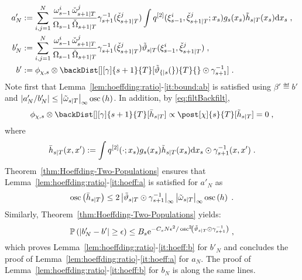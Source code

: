 \begin{align*}
a'_N & \eqdef \sum_{i,j=1}^N \frac{\ewght{s-1}{i}\,\ebackwght{s+1}{T}{j}}{\sumwght{s-1}\,\backsumwght{s+1}{T}}\gamma_{s+1}^{-1}(\ebackpart{s+1}{T}{j}) \int q^{[2]}(\epart{s-1}{i},\ebackpart{s+1}{T}{j};x_s) g_s(x_s) \tilde{h}_{s|T}(x_s) \rmd x_s\eqsp,\\
b'_N & \eqdef \sum_{i,j=1}^N \frac{\ewght{s-1}{i}\,\ebackwght{s+1}{T}{j}}{\sumwght{s-1}\,\backsumwght{s+1}{T}}\gamma_{s+1}^{-1}(\ebackpart{s+1}{T}{j})\adjfunc[smooth]{s}{T}{\epart{s-1}{i},\ebackpart{s+1}{T}{j}}\eqsp,\\
b' &\eqdef \filt{\Xinit,s}\otimes \backDist[][\gamma]{s+1}{T}[\adjfunc[smooth]{s}{T}{} \odot \gamma_{s+1}^{-1}]\eqsp.
\end{align*}
Note first that Lemma~\ref{lem:hoeffding:ratio}-\eqref{it:bound:ab} is satisfied using $\beta' \eqdef b'$ and $\left|a'_N/b'_N\right|\le \esssup{\smwghtfunc{s}{T}}\oscnorm{h}$. In addition, by \eqref{eq:filtBackfilt},
\[
\filt{\Xinit,s}\otimes \backDist[][\gamma]{s+1}{T}[\bar{h}_{s|T}] \propto \post[\chi]{s}{T}[\tilde{h}_{s|T}] = 0\eqsp,
\]
where
\[
\bar{h}_{s|T}(x,x') := \int q^{[2]}(\cdot;x_s) g_s(x_s)\tilde{h}_{s|T}(x_s) \mathrm{d} x_s\odot\gamma_{s+1}^{-1}(x,x')\;.
\]
Theorem~\ref{thm:Hoeffding-Two-Populations} ensures that Lemma~\ref{lem:hoeffding:ratio}-\eqref{it:hoeff:a} is satisfied for $a'_N$
as
$$
\oscnorm{\bar{h}_{s|T}}\le 2 \esssup{\adjfunc[smooth]{s}{T}{} \odot \gamma_{s+1}^{-1}}\esssup{\smwghtfunc{s}{T}}\oscnorm{h} \eqsp.
$$
Similarly, Theorem~\ref{thm:Hoeffding-Two-Populations} yields:
\[
\mathbb{P}\left(\left|b'_N - b' \right|\ge \epsilon\right)\le B_s \rme^{-C_s N \epsilon^2 /\oscnorm[2]{\adjfunc[smooth]{s}{T}{} \odot \gamma_{s+1}^{-1}}}\eqsp,
\]
which proves  Lemma~\ref{lem:hoeffding:ratio}-\eqref{it:hoeff:b} for $b'_N$ and concludes the proof of Lemma~\ref{lem:hoeffding:ratio}-\eqref{it:hoeff:a} for $a_N$. The proof of Lemma~\ref{lem:hoeffding:ratio}-\eqref{it:hoeff:b} for $b_N$ is along the same lines.

